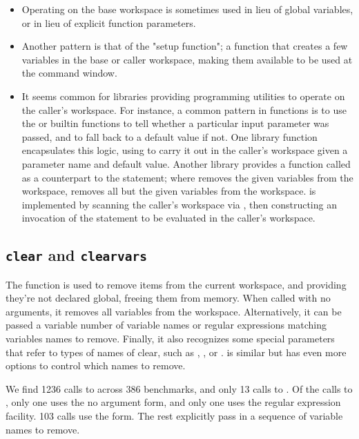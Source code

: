 \begin{itemize}

  \item Operating on the base workspace is sometimes used in lieu of global
    variables, or in lieu of explicit function parameters.

  \item Another pattern is that of the "setup function"; a function that
    creates a few variables in the base or caller workspace, making them
    available to be used at the \matlab command window.

  \item It seems common for libraries providing programming utilities to
    operate on the caller's workspace. For instance, a common pattern in
    \matlab functions is to use the  or  builtin
    functions to tell whether a particular input parameter was passed, and to
    fall back to a default value if not. One library function encapsulates this
    logic, using  to carry it out in the caller's workspace given
    a parameter name and default value. Another library provides a function
    called  as a counterpart to the  statement; where
     removes the given variables from the workspace, 
    removes all but the given variables from the workspace.  is
    implemented by scanning the caller's workspace via , then
    constructing an invocation of the  statement to be evaluated in
    the caller's workspace.

\end{itemize}

\subsection{\texttt{clear} and \texttt{clearvars}}

The  function is used to remove items from the current workspace,
and providing they're not declared global, freeing them from memory. When
called with no arguments, it removes all variables from the workspace.
Alternatively, it can be passed a variable number of variable names or regular
expressions matching variables names to remove. Finally, it also recognizes
some special parameters that refer to types of names of clear, such as
, , or .  is similar
but has even more options to control which names to remove.

We find 1236 calls to  across 386 benchmarks, and only 13 calls to
. Of the calls to , only one uses the no argument
form, and only one uses the regular expression facility. 103 calls use the
 form. The rest explicitly pass in a sequence of variable names
to remove.


